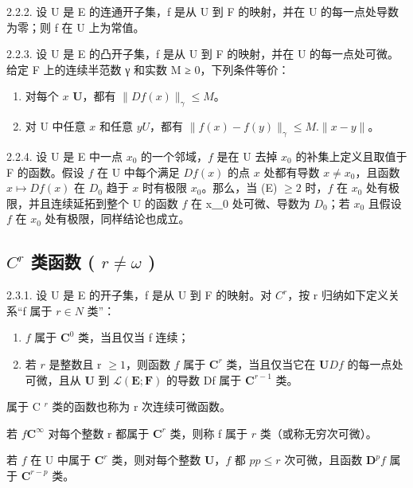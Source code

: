 2.2.2. 设 U 是 E 的连通开子集，f 是从 U 到
F 的映射，并在 U 的每一点处导数为零；则 f 在 U 上为常值。

2.2.3. 设 U 是 E 的凸开子集，f 是从 U 到 F 的映射，并在 U 的每一点处可微。给定 F 上的连续半范数 γ 和实数 M ≥ 0，下列条件等价：

\begin{enumerate}
\def\labelenumi{(\roman{enumi})}
\item
  对每个 \(x\)  \(\mathbf{U}\)，都有 \(\| Df(x)\|_{\gamma}\leqslant M\)。
\item
  对 U 中任意 \(x\) 和任意 \(y\)\(U\)，都有 \(\| f(x) - f(y)\|_{\gamma} \leqslant M . \| x - y\| \)。
\end{enumerate}

2.2.4. 设 U 是 E 中一点 \(x_0\) 的一个邻域，\(f\) 是在 U 去掉 \(x_0\) 的补集上定义且取值于 F 的函数。假设 \(f\) 在 U 中每个满足 \(Df(x)\) 的点 \(x\) 处都有导数 \(x \neq x_0\)，且函数 \(x \mapsto Df(x)\) 在 \(D_0\) 趋于 \(x\) 时有极限 \(x_0\)。那么，当  (E) \(\geqslant 2\) 时，\(f\) 在 \(x_0\) 处有极限，并且连续延拓到整个 U 的函数 \(f\) 在 x＿0 处可微、导数为 \(D_0\)；若 \(x_0\) 且假设 \(f\) 在 \(x_0\) 处有极限，同样结论也成立。

\subsection{\texorpdfstring{\(C^{r}\) 类函数 ( \(r \neq \omega\) )}{C\^{}\{r\} 类函数 (r ≠ ω)}}

2.3.1. 设 U 是 E 的开子集，f 是从 U 到 F 的映射。对 \(C^{r}\)，按 r 归纳如下定义关系“f 属于 \(r \in N\) 类”：

\begin{enumerate}
\def\labelenumi{\arabic{enumi})}
\item
  \(f\) 属于 \(\mathbf{C}^{0}\) 类，当且仅当 f 连续；
\item
  若 \(r\) 是整数且 r \(\geqslant 1\)，则函数 \(f\) 属于 \(\mathbf{C}^{r}\) 类，当且仅当它在 \(\mathbf{U}\)\(Df\) 的每一点处可微，且从 \(\mathbf{U}\) 到 \(\mathcal{L}(\mathbf{E};\mathbf{F})\) 的导数 Df 属于 \(\mathbf{C}^{r-1}\) 类。
\end{enumerate}

属于 C \(^{r}\) 类的函数也称为 r 次连续可微函数。

若 \(f\)\(\mathbf{C}^{\infty}\) 对每个整数 r 都属于 \(\mathbf{C}^{r}\) 类，则称 f 属于 \(r\) 类（或称无穷次可微）。

若 \(f\) 在 U 中属于 \(\mathbf{C}^{r}\) 类，则对每个整数 \(\mathbf{U}\)，\(f\) 都 \(p\)\(p \leqslant r\) 次可微，且函数 \(\mathbf{D}^{p}f\) 属于 \(\mathbf{C}^{r-p}\) 类。

